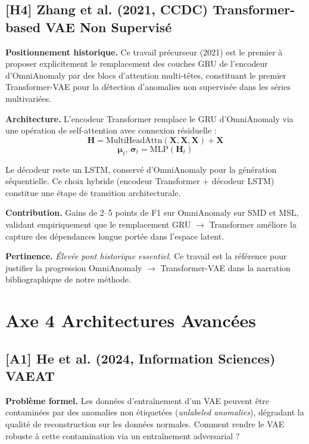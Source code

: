\documentclass[12pt,a4paper]{article}
\begin{document}
\subsection{[H4] Zhang et al. (2021, CCDC)  Transformer-based VAE Non Supervisé}

\textbf{Positionnement historique.} Ce travail précurseur (2021) est le premier à proposer explicitement le remplacement des couches GRU de l'encodeur d'OmniAnomaly par des blocs d'attention multi-têtes, constituant le premier Transformer-VAE pour la détection d'anomalies non supervisée dans les séries multivariées.

\textbf{Architecture.} L'encodeur Transformer remplace le GRU d'OmniAnomaly via une opération de self-attention avec connexion résiduelle :
$$\mathbf{H} = \mathrm{MultiHeadAttn}(\mathbf{X}, \mathbf{X}, \mathbf{X}) + \mathbf{X}$$
$$\boldsymbol{\mu}_t,\,\boldsymbol{\sigma}_t = \mathrm{MLP}(\mathbf{H}_t)$$

Le décodeur reste un LSTM, conservé d'OmniAnomaly pour la génération séquentielle. Ce choix hybride (encodeur Transformer + décodeur LSTM) constitue une étape de transition architecturale.

\textbf{Contribution.} Gains de 2--5 points de F1 sur OmniAnomaly sur SMD et MSL, validant empiriquement que le remplacement GRU $\rightarrow$ Transformer améliore la capture des dépendances longue portée dans l'espace latent.

\textbf{Pertinence.} \textit{Élevée  pont historique essentiel.} Ce travail est la référence pour justifier la progression OmniAnomaly $\rightarrow$ Transformer-VAE dans la narration bibliographique de notre méthode.

\section{Axe 4 Architectures Avancées}

\subsection{[A1] He et al. (2024, Information Sciences)  VAEAT}

\textbf{Problème formel.} Les données d'entraînement d'un VAE peuvent être contaminées par des anomalies non étiquetées (\textit{unlabeled anomalies}), dégradant la qualité de reconstruction sur les données normales. Comment rendre le VAE robuste à cette contamination via un entraînement adversarial ?
\end{document}
